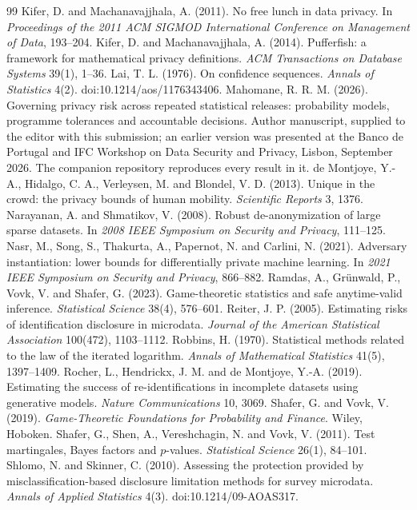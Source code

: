 \documentclass{jpc}
\theoremstyle{remark}
\begin{document}
\begin{thebibliography}{99}
 Kifer, D. and Machanavajjhala, A. (2011). No free lunch in data privacy. In \emph{Proceedings of the 2011 ACM SIGMOD International Conference on Management of Data}, 193--204.
 Kifer, D. and Machanavajjhala, A. (2014). Pufferfish: a framework for mathematical privacy definitions. \emph{ACM Transactions on Database Systems} 39(1), 1--36.
 Lai, T. L. (1976). On confidence sequences. \emph{Annals of Statistics} 4(2). doi:10.1214/aos/1176343406.
 Mahomane, R. R. M. (2026). Governing privacy risk across repeated statistical releases: probability models, programme tolerances and accountable decisions. Author manuscript, supplied to the editor with this submission; an earlier version was presented at the Banco de Portugal and IFC Workshop on Data Security and Privacy, Lisbon, September 2026. The companion repository reproduces every result in it.
 de Montjoye, Y.-A., Hidalgo, C. A., Verleysen, M. and Blondel, V. D. (2013). Unique in the crowd: the privacy bounds of human mobility. \emph{Scientific Reports} 3, 1376.
 Narayanan, A. and Shmatikov, V. (2008). Robust de-anonymization of large sparse datasets. In \emph{2008 IEEE Symposium on Security and Privacy}, 111--125.
 Nasr, M., Song, S., Thakurta, A., Papernot, N. and Carlini, N. (2021). Adversary instantiation: lower bounds for differentially private machine learning. In \emph{2021 IEEE Symposium on Security and Privacy}, 866--882.
 Ramdas, A., Gr\"unwald, P., Vovk, V. and Shafer, G. (2023). Game-theoretic statistics and safe anytime-valid inference. \emph{Statistical Science} 38(4), 576--601.
 Reiter, J. P. (2005). Estimating risks of identification disclosure in microdata. \emph{Journal of the American Statistical Association} 100(472), 1103--1112.
 Robbins, H. (1970). Statistical methods related to the law of the iterated logarithm. \emph{Annals of Mathematical Statistics} 41(5), 1397--1409.
 Rocher, L., Hendrickx, J. M. and de Montjoye, Y.-A. (2019). Estimating the success of re-identifications in incomplete datasets using generative models. \emph{Nature Communications} 10, 3069.
 Shafer, G. and Vovk, V. (2019). \emph{Game-Theoretic Foundations for Probability and Finance}. Wiley, Hoboken.
 Shafer, G., Shen, A., Vereshchagin, N. and Vovk, V. (2011). Test martingales, Bayes factors and $p$-values. \emph{Statistical Science} 26(1), 84--101.
 Shlomo, N. and Skinner, C. (2010). Assessing the protection provided by misclassification-based disclosure limitation methods for survey microdata. \emph{Annals of Applied Statistics} 4(3). doi:10.1214/09-AOAS317.

\end{thebibliography}
\end{document}
